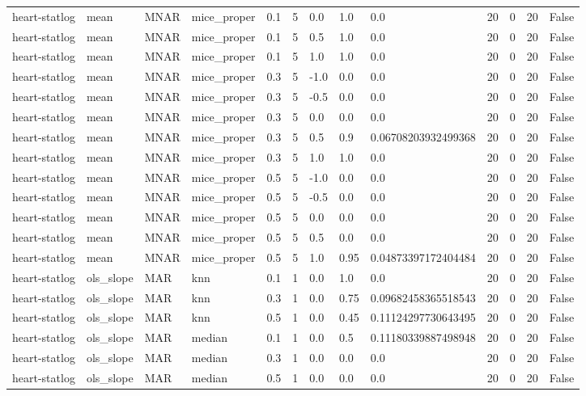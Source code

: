 \begin{tabular}{lllllllllllll}
heart-statlog & mean & MNAR & mice\_proper & 0.1 & 5 & 0.0 & 1.0 & 0.0 & 20 & 0 & 20 & False \\
heart-statlog & mean & MNAR & mice\_proper & 0.1 & 5 & 0.5 & 1.0 & 0.0 & 20 & 0 & 20 & False \\
heart-statlog & mean & MNAR & mice\_proper & 0.1 & 5 & 1.0 & 1.0 & 0.0 & 20 & 0 & 20 & False \\
heart-statlog & mean & MNAR & mice\_proper & 0.3 & 5 & -1.0 & 0.0 & 0.0 & 20 & 0 & 20 & False \\
heart-statlog & mean & MNAR & mice\_proper & 0.3 & 5 & -0.5 & 0.0 & 0.0 & 20 & 0 & 20 & False \\
heart-statlog & mean & MNAR & mice\_proper & 0.3 & 5 & 0.0 & 0.0 & 0.0 & 20 & 0 & 20 & False \\
heart-statlog & mean & MNAR & mice\_proper & 0.3 & 5 & 0.5 & 0.9 & 0.06708203932499368 & 20 & 0 & 20 & False \\
heart-statlog & mean & MNAR & mice\_proper & 0.3 & 5 & 1.0 & 1.0 & 0.0 & 20 & 0 & 20 & False \\
heart-statlog & mean & MNAR & mice\_proper & 0.5 & 5 & -1.0 & 0.0 & 0.0 & 20 & 0 & 20 & False \\
heart-statlog & mean & MNAR & mice\_proper & 0.5 & 5 & -0.5 & 0.0 & 0.0 & 20 & 0 & 20 & False \\
heart-statlog & mean & MNAR & mice\_proper & 0.5 & 5 & 0.0 & 0.0 & 0.0 & 20 & 0 & 20 & False \\
heart-statlog & mean & MNAR & mice\_proper & 0.5 & 5 & 0.5 & 0.0 & 0.0 & 20 & 0 & 20 & False \\
heart-statlog & mean & MNAR & mice\_proper & 0.5 & 5 & 1.0 & 0.95 & 0.04873397172404484 & 20 & 0 & 20 & False \\
heart-statlog & ols\_slope & MAR & knn & 0.1 & 1 & 0.0 & 1.0 & 0.0 & 20 & 0 & 20 & False \\
heart-statlog & ols\_slope & MAR & knn & 0.3 & 1 & 0.0 & 0.75 & 0.09682458365518543 & 20 & 0 & 20 & False \\
heart-statlog & ols\_slope & MAR & knn & 0.5 & 1 & 0.0 & 0.45 & 0.11124297730643495 & 20 & 0 & 20 & False \\
heart-statlog & ols\_slope & MAR & median & 0.1 & 1 & 0.0 & 0.5 & 0.11180339887498948 & 20 & 0 & 20 & False \\
heart-statlog & ols\_slope & MAR & median & 0.3 & 1 & 0.0 & 0.0 & 0.0 & 20 & 0 & 20 & False \\
heart-statlog & ols\_slope & MAR & median & 0.5 & 1 & 0.0 & 0.0 & 0.0 & 20 & 0 & 20 & False \\

\end{tabular}
